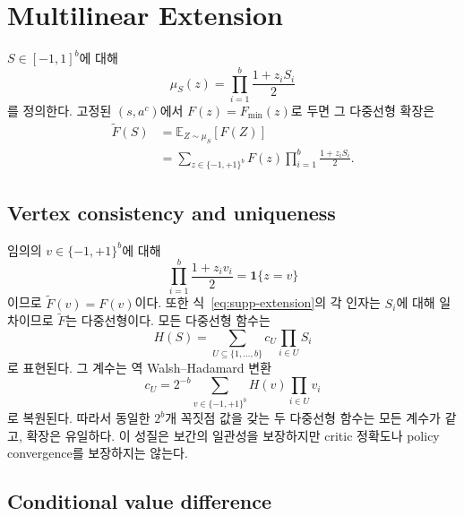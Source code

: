 \documentclass[10pt,journal]{IEEEtran}
\newcommand{\E}{\mathbb{E}}
\begin{document}
\section{Multilinear Extension}
\label{sec:multilinear}

$S\in[-1,1]^b$에 대해
\begin{equation}
\mu_S(z)=\prod_{i=1}^{b}\frac{1+z_iS_i}{2}
\label{eq:supp-mu}
\end{equation}
를 정의한다. 고정된 $(s,a^c)$에서 $F(z)=F_{\min}(z)$로 두면 그 다중선형 확장은
\begin{align}
\widetilde F(S)
&=\E_{Z\sim\mu_S}[F(Z)]\\
&=\sum_{z\in\{-1,+1\}^b}F(z)
\prod_{i=1}^{b}\frac{1+z_iS_i}{2}.
\label{eq:supp-extension}
\end{align}

\subsection{Vertex consistency and uniqueness}

임의의 $v\in\{-1,+1\}^b$에 대해
\begin{equation}
\prod_{i=1}^{b}\frac{1+z_iv_i}{2}=\mathbf1\{z=v\}
\end{equation}
이므로 $\widetilde F(v)=F(v)$이다. 또한 식~\eqref{eq:supp-extension}의 각 인자는 $S_i$에 대해 일차이므로 $\widetilde F$는 다중선형이다. 모든 다중선형 함수는
\begin{equation}
H(S)=\sum_{U\subseteq\{1,\ldots,b\}}c_U\prod_{i\in U}S_i
\end{equation}
로 표현된다. 그 계수는 역 Walsh--Hadamard 변환
\begin{equation}
c_U=2^{-b}\sum_{v\in\{-1,+1\}^b}H(v)\prod_{i\in U}v_i
\label{eq:supp-walsh-inverse}
\end{equation}
로 복원된다. 따라서 동일한 $2^b$개 꼭짓점 값을 갖는 두 다중선형 함수는 모든 계수가 같고, 확장은 유일하다. 이 성질은 보간의 일관성을 보장하지만 critic 정확도나 policy convergence를 보장하지는 않는다.

\subsection{Conditional value difference}
\end{document}
